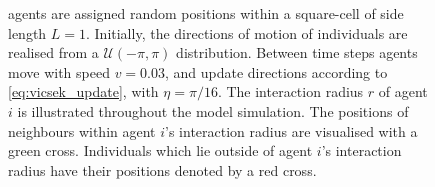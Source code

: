 \begin{figure}[tb]
{        agents are assigned random positions within a square-cell of side length $L=1$.
        Initially, the directions of motion of individuals are realised from a
        $\mathcal{U}(-\pi, \pi)$ distribution. Between time steps agents move with speed
        $v=0.03$, and update directions according to \cref{eq:vicsek_update}, with
        $\eta=\pi/16$. The interaction radius $r$ of agent $i$ is illustrated throughout
        the model simulation. The positions of neighbours within agent $i$'s interaction
        radius are visualised with a green cross. Individuals which lie outside of agent
        $i$'s interaction radius have their positions denoted by a red cross.}
\end{figure}

